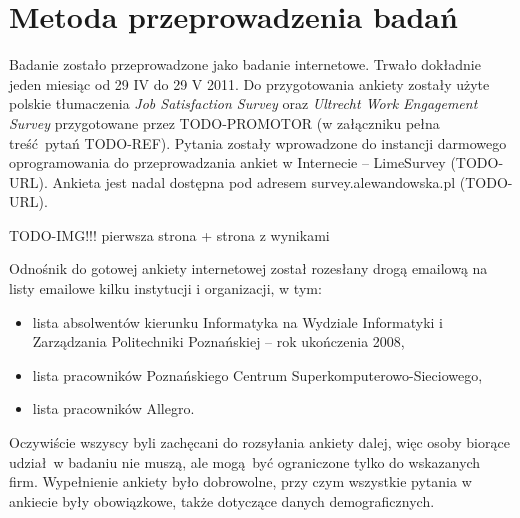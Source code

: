 \section{Metoda przeprowadzenia badań}
Badanie zostało przeprowadzone jako badanie internetowe. Trwało dokładnie jeden miesiąc od 29 IV do 29 V 2011. Do przygotowania ankiety zostały użyte polskie tłumaczenia \emph{Job Satisfaction Survey} oraz \emph{Ultrecht Work Engagement Survey} przygotowane przez TODO-PROMOTOR (w załączniku pełna treść pytań TODO-REF). Pytania zostały wprowadzone do instancji darmowego oprogramowania do przeprowadzania ankiet w Internecie -- LimeSurvey (TODO-URL). Ankieta jest nadal dostępna pod
adresem survey.alewandowska.pl (TODO-URL). 

TODO-IMG!!! pierwsza strona + strona z wynikami

Odnośnik do gotowej ankiety internetowej został rozesłany drogą emailową na listy emailowe kilku instytucji i organizacji, w tym:
\begin{itemize}
\item lista absolwentów kierunku Informatyka na Wydziale Informatyki i Zarządzania Politechniki Poznańskiej -- rok ukończenia 2008,
\item lista pracowników Poznańskiego Centrum Superkomputerowo-Sieciowego,
\item lista pracowników Allegro.
\end{itemize}
Oczywiście wszyscy byli zachęcani do rozsyłania ankiety dalej, więc osoby biorące udział w badaniu nie muszą, ale mogą być ograniczone tylko do wskazanych firm. Wypełnienie ankiety było dobrowolne, przy czym wszystkie pytania w ankiecie były obowiązkowe, także dotyczące danych demograficznych.
